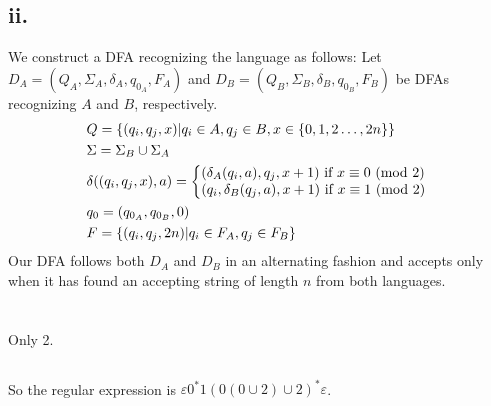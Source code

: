 \documentclass{article}
\begin{document}
\subsection*{ii.} %
We construct a DFA recognizing the language as follows:
\newline
\newline
Let $D_A=(Q_A,\Sigma_A,\delta_A,q_{0_A},F_A)$ and $D_B=(Q_B,\Sigma_B,\delta_B,q_{0_B},F_B)$
be DFAs recognizing $A$ and $B$, respectively.
\begin{align*}
	&Q=\{(q_i,q_j,x)|q_i\in A,q_j\in B,x\in\{0,1,2\ldots,2n\}\}\\
	&\Sigma=\Sigma_B\cup\Sigma_A\\
	&\delta((q_i,q_j,x),a)=\left\{
	\begin{array}{@{}ll@{}}
		(\delta_A(q_i,a),q_j,x+1)\text{ if $x\equiv0$ (mod 2)}\\
		(q_i,\delta_B(q_j,a),x+1)\text{ if $x\equiv1$ (mod 2)}
	\end{array}\right.\\
	&q_0=(q_{0_A},q_{0_B},0)\\
	&F=\{(q_i,q_j,2n)|q_i\in F_A,q_j\in F_B\}
\end{align*}
Our DFA follows both $D_A$ and $D_B$ in an alternating fashion and accepts only
when it has found an accepting string of length $n$ from both languages.
\section{} %
\subsection{} %
Only 2.
\subsection{} %
\begin{minipage}{\textwidth}

\end{minipage}
\begin{minipage}{\textwidth}

\end{minipage}
\begin{minipage}{\textwidth}

\end{minipage}
\begin{minipage}{\textwidth}

\end{minipage}
\begin{minipage}{\textwidth}

\end{minipage}
So the regular expression is $\varepsilon0^*1(0(0\cup2)\cup2)^*\varepsilon$.
\end{document}

